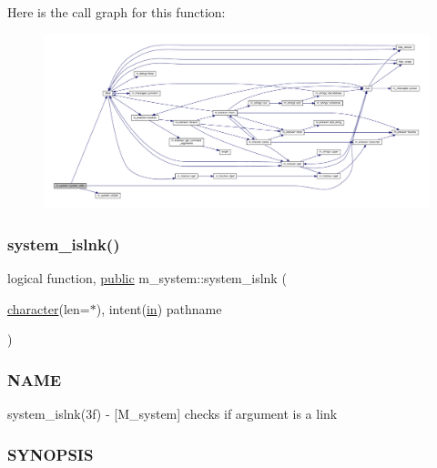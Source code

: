 Here is the call graph for this function\+:
\nopagebreak
\begin{figure}[H]
\begin{center}
\leavevmode
\includegraphics[width=350pt]{namespacem__system_acbcaa0c5075ca103815f441ee410e1a3_cgraph}
\end{center}
\end{figure}
\mbox{\label{namespacem__system_ab05694cc3d76a3ecc87e4b4490c4c217}} 
\subsubsection{\texorpdfstring{system\+\_\+islnk()}{system\_islnk()}}
{\footnotesize\ttfamily logical function, \hyperlink{M__stopwatch_83_8txt_a2f74811300c361e53b430611a7d1769f}{public} m\+\_\+system\+::system\+\_\+islnk (\begin{DoxyParamCaption}\item[{\hyperlink{option__stopwatch_83_8txt_abd4b21fbbd175834027b5224bfe97e66}{character}(len=$\ast$), intent(\hyperlink{M__journal_83_8txt_afce72651d1eed785a2132bee863b2f38}{in})}]{pathname }\end{DoxyParamCaption})}



\subsubsection*{N\+A\+ME}

system\+\_\+islnk(3f) -\/ \mbox{[}M\+\_\+system\mbox{]} checks if argument is a link 

\subsubsection*{S\+Y\+N\+O\+P\+S\+IS}

